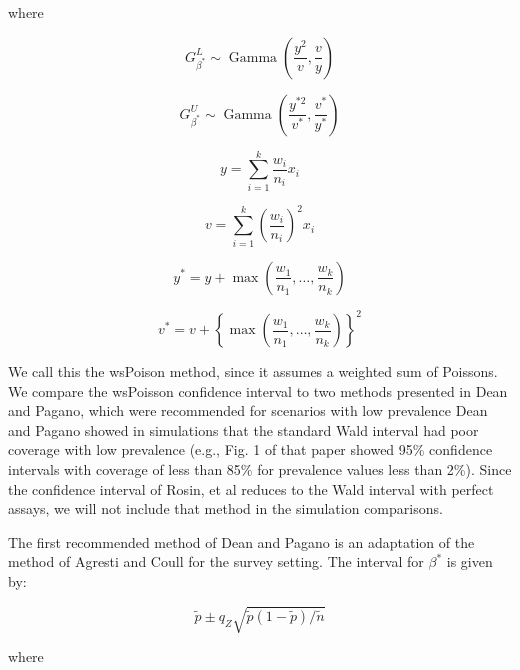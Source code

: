 \documentclass[AMA,STIX1COL]{WileyNJD-v2}
\begin{document}
where

\begin{equation*}
    G_{\beta^*}^L \sim \operatorname{Gamma}\left( \frac{y^2}{v}, \frac{v}{y} \right)
\end{equation*}

\begin{equation*}
    G_{\beta^*}^U \sim \operatorname{Gamma}\left( \frac{y^{*2}}{v^*}, \frac{v^*}{y^*} \right)
\end{equation*}

\begin{equation*}
    y = \sum_{i=1}^k \frac{w_i}{n_i} x_i
\end{equation*}

\begin{equation*}
    v = \sum_{i=1}^k \left( \frac{w_i}{n_i}\right)^2 x_i
\end{equation*}

\begin{equation*}
    y^* = y + \max\left(\frac{w_1}{n_1}, \ldots, \frac{w_k}{n_k} \right)
\end{equation*}

\begin{equation*}
    v^* = v + \left\{ \max\left(\frac{w_1}{n_1}, \ldots, \frac{w_k}{n_k} \right) \right\}^2
\end{equation*}

We call this the wsPoison method, since it assumes a weighted sum of Poissons.
We compare the wsPoisson confidence interval to two methods presented in Dean and Pagano\cite{Dean:2015}, which were recommended for scenarios with low prevalence
Dean and Pagano showed in simulations that the standard Wald interval had poor coverage with low prevalence (e.g., Fig. 1 of that paper showed 95\% confidence intervals with coverage of less than 85\% for prevalence values less than 2\%).
Since the confidence interval of Rosin, et al \cite{rosin2021estimating} reduces to the Wald interval with perfect assays, we will not include that method in the simulation comparisons.

The first recommended method of Dean and Pagano is an adaptation of the method of Agresti and Coull\cite{AgrestiCoull} for the survey setting.
The interval for \( \beta^* \) is given by:

\begin{equation}
    \tilde{p} \pm q_Z \sqrt{\tilde{p}(1 - \tilde{p}) / \tilde{n}}
\end{equation}

where 
\end{document}
